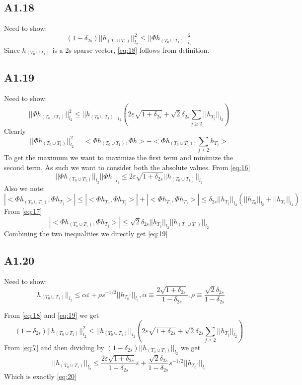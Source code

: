 \documentclass{article}
\newcommand{\lone}[1]{
  ||#1||_{l_1}
}
\newcommand{\ltwo}[1]{
  ||#1||_{l_2}
}
\newcommand{\htj}[1]{
  h_{T_{#1}}
}
\newcommand{\htc}[1]{
  h_{{#1}^c}
}
\newcommand{\hto}[1]{
  h_{#1}
}
\newcommand{\htzo}{
  h_{(T_0 \cup T_1)}
}
\begin{document}
\subsection*{A1.18}
Need to show:
\begin{equation}
  \label{eq:18}
  (1-\delta_{2s})\ltwo{\htzo}^2 \le \ltwo{\Phi\htzo}^2
\end{equation}
Since $\htzo$ is a 2s-sparse vector, \ref{eq:18} follows from definition.

\subsection*{A1.19}
Need to show:
\begin{equation}
  \label{eq:19}
  \ltwo{\Phi\htzo}^2 \le \ltwo{\htzo} (2\varepsilon\sqrt{1+\delta_{2s}} + \sqrt{2}\delta_{2s}\sum_{j \ge 2}\ltwo{\htj{j}}) 
\end{equation}
Clearly
$$\ltwo{\Phi\htzo}^2 = <\Phi\htzo,\Phi h> - <\Phi \htzo, \sum_{j \ge 2}\htj{j}>$$
To get the maximum we want to maximize the first term and minimize the second term. As such we want to consider both
the absolute values. 
From \ref{eq:16}
$$\ltwo{\Phi\htzo}\ltwo{\Phi h} \le 2 \varepsilon \sqrt{1+\delta_{2s}}\ltwo{\htzo}$$
Also we note:
$$|<\Phi\htzo,\Phi\htj{j}>| \le |<\Phi\hto{T_0},\Phi\htj{j}>| + |<\Phi\hto{T_1},\Phi\htj{j}>| \le \delta_{2s}\ltwo{\htj{j}}(\ltwo{\hto{T_0}} + \ltwo{\hto{T_1}})$$
From \ref{eq:17}
$$|<\Phi\htzo,\Phi\htj{j}>| \le \sqrt{2}\delta_{2s}\ltwo{\htj{j}}\ltwo{\htzo}$$
Combining the two inequalities we directly get \ref{eq:19}

\subsection*{A1.20}
Need to show:
\begin{equation}
  \label{eq:20}
  \ltwo{\htzo} \le \alpha \varepsilon + \rho s^{-1/2}\lone{\htc{T_0}} , \alpha \equiv \frac{2\sqrt{1+\delta_{2s}}}{1-\delta_{2s}}, \rho \equiv \frac{\sqrt{2}\delta_{2s}}{1-\delta_{2s}}
\end{equation}

From \ref{eq:18} and \ref{eq:19} we get
$$(1-\delta_{2s})\ltwo{\htzo}^2 \le \ltwo{\htzo} (2\varepsilon\sqrt{1+\delta_{2s}} + \sqrt{2}\delta_{2s}\sum_{j \ge 2}\ltwo{\htj{j}})$$
From \ref{eq:7} and then dividing by $(1-\delta_{2s})\ltwo{\htzo}$ we get
$$\ltwo{\htzo} \le \frac{2\varepsilon\sqrt{1+\delta_{2s}}}{1-\delta_{2s}}\varepsilon + \frac{\sqrt{2}\delta_{2s}}{1-\delta_{2s}}s^{-1/2} \lone{\htc{T_0}}$$
Which is exactly \ref{eq:20}
\end{document}
